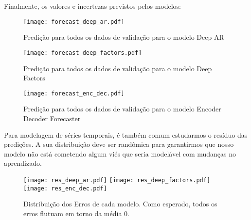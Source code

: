 Finalmente, os valores e incertezas previstos pelos modelos:


\begin{figure}[H]
  \label{fig:fordeepar}
  \centering
\texttt{[image: forecast\_deep\_ar.pdf]} 
\caption{Predição para todos os dados de validação para o modelo Deep AR}
\end{figure}

\begin{figure}[H]
  \label{fig:fordeepfactors}
  \centering
\texttt{[image: forecast\_deep\_factors.pdf]} 
\caption{Predição para todos os dados de validação para o modelo Deep Factors}
\end{figure}

\begin{figure}[H]
  \label{fig:forencdec}
  \centering
\texttt{[image: forecast\_enc\_dec.pdf]} 
\caption{Predição para todos os dados de validação para o modelo Encoder Decoder Forecaster} 
\end{figure}


Para modelagem de séries temporais, é também comum estudarmos o resíduo das predições. A sua distribuição deve ser randômica para garantirmos que nosso modelo não está cometendo algum viés que seria
modelável com mudanças no aprendizado. \\


\begin{figure}[H]
\label{fig:distr}
\centering
\texttt{[image: res\_deep\_ar.pdf]} \hfill
\texttt{[image: res\_deep\_factors.pdf]} \hfill
\texttt{[image: res\_enc\_dec.pdf]} 
\caption{Distribuição dos Erros de cada modelo. Como esperado, todos os erros flutuam em torno da média 0. } 
\end{figure}



